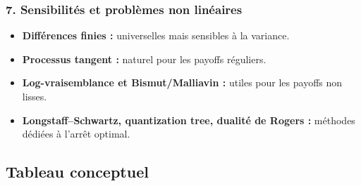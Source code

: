 \documentclass[11pt,a4paper]{article}
\begin{document}
\subsubsection*{7. Sensibilités et problèmes non linéaires}

\begin{itemize}
  \item \textbf{Différences finies :} universelles mais sensibles à la variance.
  \item \textbf{Processus tangent :} naturel pour les payoffs réguliers.
  \item \textbf{Log-vraisemblance et Bismut/Malliavin :} utiles pour les payoffs non lisses.
  \item \textbf{Longstaff--Schwartz, quantization tree, dualité de Rogers :} méthodes dédiées à l'arrêt optimal.
\end{itemize}

\subsection{Tableau conceptuel}
\end{document}
